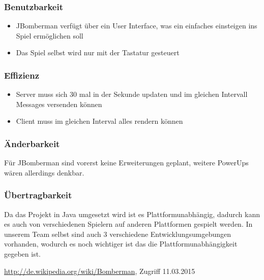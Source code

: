 \documentclass[11pt]{scrartcl}
\begin{document}
\subsubsection{Benutzbarkeit}
\label{sec:Benutzbarkeit}
\begin{itemize}
    \item JBomberman verfügt über ein User Interface, was ein 
    einfaches einsteigen ins Spiel ermöglichen soll
    \item Das Spiel selbst wird nur mit der Tastatur gesteuert
\end{itemize}

\subsubsection{Effizienz}
\label{sec:Effizienz}
\begin{itemize}
    \item Server muss sich 30 mal in der Sekunde updaten und
     im gleichen Intervall Messages versenden können
    \item Client muss im gleichen Interval alles rendern können
\end{itemize}

\subsubsection{Änderbarkeit}
\label{sec:Änderbarkeit}
Für JBomberman sind vorerst keine Erweiterungen geplant, 
weitere PowerUps wären allerdings denkbar.


\subsubsection{Übertragbarkeit}
\label{sec:Übertragbarkeit}
Da das Projekt in Java umgesetzt wird ist es Plattformunabhängig, 
dadurch kann es auch von verschiedenen Spielern auf anderen 
Plattformen gespielt werden.
In unserem Team selbst sind auch 3 verschiedene Entwicklungsumgebungen 
vorhanden, wodurch es noch wichtiger ist das die Plattformunabhängigkeit gegeben ist.



\begin{thebibliography}{999}
\url{http://de.wikipedia.org/wiki/Bomberman}, Zugriff 
11.03.2015
\end{thebibliography}
\end{document}
